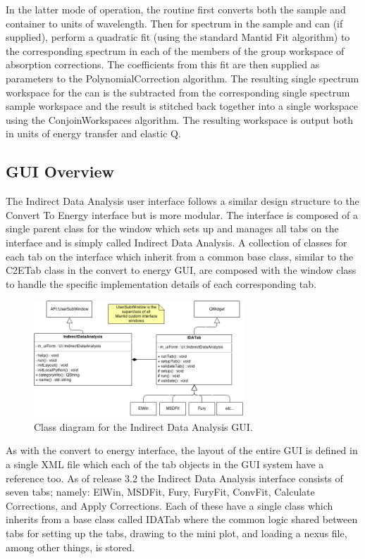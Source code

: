 \documentclass[paper=a4, fontsize=11pt]{scrartcl}	%
\numberwithin{equation}{section}															%
\numberwithin{figure}{section}																%
\numberwithin{table}{section}																%
\begin{document}
In the latter mode of operation, the routine first converts both the sample and container to units of wavelength. Then for spectrum in the sample and can (if supplied), perform a quadratic fit (using the standard Mantid Fit algorithm) to the corresponding spectrum in each of the members of the group workspace of absorption corrections. The coefficients from this fit are then supplied as parameters to the PolynomialCorrection algorithm. The resulting single spectrum workspace for the can is the subtracted from the corresponding single spectrum sample workspace and the result is stitched back together into a single workspace using the ConjoinWorkspaces algorithm. The resulting workspace is output both in units of energy transfer and elastic Q.

\subsection{GUI Overview}
\label{subsubsec:IDA-GUI-Overview}
The Indirect Data Analysis user interface follows a similar design structure to the Convert To Energy interface but is more modular. The interface is composed of a single parent class for the window which sets up and manages all tabs on the interface and is simply called Indirect Data Analysis. A collection of classes for each tab on the interface which inherit from a common base class, similar to the C2ETab class in the convert to energy GUI, are composed with the window class to handle the specific implementation details of each corresponding tab.

\begin{figure}[H]
\centering
\includegraphics[width=0.7\textwidth]{img/uml/class_diagrams/IDA_structure.png}
\caption{Class diagram for the Indirect Data Analysis GUI.}
\label{fig:instrument-energy-range}
\end{figure}

As with the convert to energy interface, the layout of the entire GUI is defined in a single XML file which each of the tab objects in the GUI system have a reference too. As of release 3.2 the Indirect Data Analysis interface consists of seven tabs; namely: ElWin, MSDFit, Fury, FuryFit, ConvFit, Calculate Corrections, and Apply Corrections. Each of these have a single class which inherits from a base class called IDATab where the common logic shared between tabs for setting up the tabs, drawing to the mini plot, and loading a nexus file, among other things, is stored.
\end{document}
